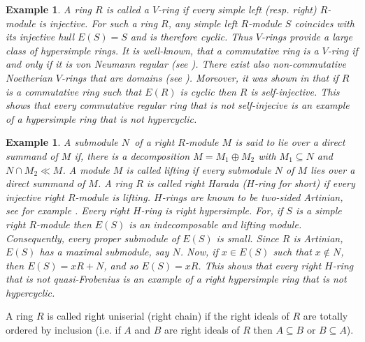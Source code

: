\documentclass{amsart}
\theoremstyle{plain}
\newtheorem{example}[theorem]{Example}
\numberwithin{equation}{section}
\begin{document}
\begin{example}
A ring $R$ is called a $V$-ring if every simple left (resp. right) $R$-module is injective. For such a ring $R$, any simple left $R$-module $S$ coincides with its injective hull $E (S) =S$ and is therefore cyclic. Thus $V$-rings provide a large class of hypersimple rings. It is well-known, that a commutative ring is a $V$-ring if and only if it is von Neumann regular (see \cite{MV}).
There exist also non-commutative Noetherian $V$-rings that are domains (see \cite{CF}). Moreover, it
was shown in \cite[Corollary 2.7]{IY 5}
that if $R$ is a commutative ring such that $E (R)$ is cyclic then $R$ is self-injective. This shows that every commutative regular ring that is not self-injecive is an example of a hypersimple ring that
is not hypercyclic. 
\end{example}


\begin{example}
A submodule $N$\ of a right $R$-module $M$ is said to lie over a direct summand of $M$ if, there is a decomposition $M =M_{1} \oplus M_{2}$ with $M_{1} \subseteq N$ and $N \cap M_{2} \ll M$. A module $M$ is called lifting if every submodule $N$ of $M$ lies over a direct summand of $M$. A ring $R$ is called right Harada ($H$-ring for short) \cite[Theorem 3.1.12]{BO}
if every injective right $R$-module is lifting. $H$-rings are known to be two-sided Artinian, see for example \cite{BO}.
Every right $H$-ring is right hypersimple. For, if $S$ is a simple right $R$-module then $E (S)$ is an indecomposable and lifting module. Consequently, every proper submodule of $E (S)$ is small. Since $R$ is Artinian, $E (S)$ has a maximal submodule, say $N$. Now, if $x \in E (S)$ such that $x \notin N$, then $E (S) =x R +N$, and so $E (S) =x R$. This shows that every right $H$-ring that is not quasi-Frobenius is an example of a right hypersimple ring that is not hypercyclic. 
\end{example}

A ring $R$ is called right uniserial (right chain) if the right ideals of $R$ are totally ordered by inclusion (i.e. if $A$ and $B$ are right ideals of $R$ then $A \subseteq B$ or $B \subseteq A$). 
\end{document}
